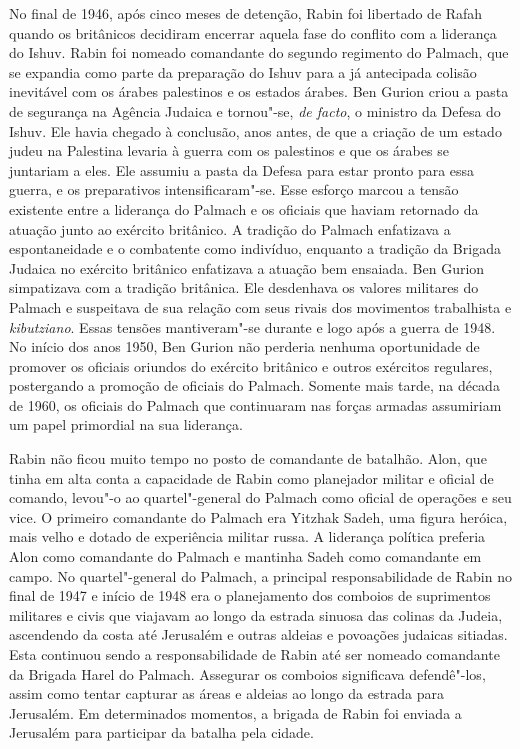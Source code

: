 No final de 1946, após cinco meses de detenção, Rabin foi libertado de
Rafah quando os britânicos decidiram encerrar aquela fase do conflito
com a liderança do Ishuv. Rabin foi nomeado comandante do segundo
regimento do Palmach, que se expandia como parte da preparação do Ishuv
para a já antecipada colisão inevitável com os árabes palestinos e os
estados árabes. Ben Gurion criou a pasta de segurança na Agência Judaica
e tornou"-se, \textit{de facto}, o ministro da Defesa do Ishuv. Ele havia
chegado à conclusão, anos antes, de que a criação de um estado judeu na
Palestina levaria à guerra com os palestinos e que os árabes se
juntariam a eles. Ele assumiu a pasta da Defesa para estar pronto para
essa guerra, e os preparativos intensificaram"-se. Esse esforço marcou a
tensão existente entre a liderança do Palmach e os oficiais que haviam
retornado da atuação junto ao exército britânico. A tradição do Palmach
enfatizava a espontaneidade e o combatente como indivíduo, enquanto a
tradição da Brigada Judaica no exército britânico enfatizava a atuação
bem ensaiada. Ben Gurion simpatizava com a tradição britânica. Ele
desdenhava os valores militares do Palmach e suspeitava de sua relação
com seus rivais dos movimentos trabalhista e \textit{kibutziano}. Essas tensões
mantiveram"-se durante e logo após a guerra de 1948. No início dos anos
1950, Ben Gurion não perderia nenhuma oportunidade de promover os
oficiais oriundos do exército britânico e outros exércitos regulares,
postergando a promoção de oficiais do Palmach. Somente mais tarde, na
década de 1960, os oficiais do Palmach que continuaram nas forças
armadas assumiriam um papel primordial na sua liderança.

Rabin não ficou muito tempo no posto de comandante de batalhão. Alon,
que tinha em alta conta a capacidade de Rabin como planejador militar e
oficial de comando, levou"-o ao quartel"-general do Palmach como oficial
de operações e seu vice. O primeiro comandante do Palmach era Yitzhak
Sadeh, uma figura heróica, mais velho e dotado de experiência militar
russa. A liderança política preferia Alon como comandante do Palmach e
mantinha Sadeh como comandante em campo. No quartel"-general do Palmach,
a principal responsabilidade de Rabin no final de 1947 e início de 1948
era o planejamento dos comboios de suprimentos militares e civis que
viajavam ao longo da estrada sinuosa das colinas da Judeia, ascendendo
da costa até Jerusalém e outras aldeias e povoações judaicas sitiadas.
Esta continuou sendo a responsabilidade de Rabin até ser nomeado
comandante da Brigada Harel do Palmach. Assegurar os comboios
significava defendê"-los, assim como tentar capturar as áreas e aldeias
ao longo da estrada para Jerusalém. Em determinados momentos, a brigada
de Rabin foi enviada a Jerusalém para participar da batalha pela cidade.

